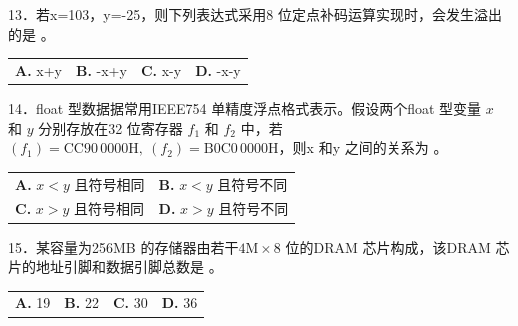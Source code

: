 \documentclass[UTF8,11pt]{ctexart}
\begin{document}
13．若x=103，y=-25，则下列表达式采用8 位定点补码运算实现时，会发生溢出的是 。


\begin{center}\begin{tabular}{>{\raggedright\arraybackslash}p{\dimexpr(\linewidth-8\tabcolsep)/4\relax}>{\raggedright\arraybackslash}p{\dimexpr(\linewidth-8\tabcolsep)/4\relax}>{\raggedright\arraybackslash}p{\dimexpr(\linewidth-8\tabcolsep)/4\relax}>{\raggedright\arraybackslash}p{\dimexpr(\linewidth-8\tabcolsep)/4\relax}}
\textbf{A.} x+y & \textbf{B.} -x+y & \textbf{C.} x-y & \textbf{D.} -x-y\\[.35em]\end{tabular}\end{center}

14．float 型数据据常用IEEE754 单精度浮点格式表示。假设两个float 型变量 \(\displaystyle x\) 和 \(\displaystyle y\) 分别存放在32 位寄存器 \(\displaystyle f_1\) 和 \(\displaystyle f_2\) 中，若\(\displaystyle (f_1)=\mathrm{CC90\,0000H},\allowbreak \ (f_2)=\mathrm{B0C0\,0000H}\)，则x 和y 之间的关系为 。


\begin{center}\begin{tabular}{>{\raggedright\arraybackslash}p{\dimexpr(\linewidth-4\tabcolsep)/2\relax}>{\raggedright\arraybackslash}p{\dimexpr(\linewidth-4\tabcolsep)/2\relax}}
\textbf{A.} \(\displaystyle x<y\) 且符号相同 & \textbf{B.} \(\displaystyle x<y\) 且符号不同\\[.35em]
\textbf{C.} \(\displaystyle x>y\) 且符号相同 & \textbf{D.} \(\displaystyle x>y\) 且符号不同\\[.35em]\end{tabular}\end{center}

15．某容量为256MB 的存储器由若干\(\displaystyle 4\mathrm M\times8\) 位的DRAM 芯片构成，该DRAM 芯片的地址引脚和数据引脚总数是 。


\begin{center}\begin{tabular}{>{\raggedright\arraybackslash}p{\dimexpr(\linewidth-8\tabcolsep)/4\relax}>{\raggedright\arraybackslash}p{\dimexpr(\linewidth-8\tabcolsep)/4\relax}>{\raggedright\arraybackslash}p{\dimexpr(\linewidth-8\tabcolsep)/4\relax}>{\raggedright\arraybackslash}p{\dimexpr(\linewidth-8\tabcolsep)/4\relax}}
\textbf{A.} 19 & \textbf{B.} 22 & \textbf{C.} 30 & \textbf{D.} 36\\[.35em]\end{tabular}\end{center}
\end{document}
